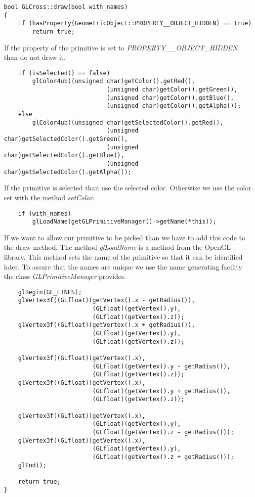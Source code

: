 \begin{verbatim}
bool GLCross::draw(bool with_names)
{
	if (hasProperty(GeometricObject::PROPERTY__OBJECT_HIDDEN) == true)
		return true;
\end{verbatim}

If the property of the primitive is set to {\em PROPERTY\_\_OBJECT\_HIDDEN} than
do not draw it. 

\begin{verbatim}
	if (isSelected() == false)
		glColor4ub((unsigned char)getColor().getRed(),
							 (unsigned char)getColor().getGreen(),
							 (unsigned char)getColor().getBlue(),
							 (unsigned char)getColor().getAlpha());
	else
		glColor4ub((unsigned char)getSelectedColor().getRed(),
							 (unsigned char)getSelectedColor().getGreen(),
							 (unsigned char)getSelectedColor().getBlue(),
							 (unsigned char)getSelectedColor().getAlpha());
\end{verbatim}

If the primitive is selected than use the selected color. Otherwise
we use the color set with the method {\em setColor}.

\begin{verbatim}
	if (with_names)
		glLoadName(getGLPrimitiveManager()->getName(*this));
\end{verbatim}

If we want to allow our primitive to be picked than we have to add this code
to the draw method. The method {\em glLoadName} is a method from the OpenGL
library. This method sets the name of the primitive so that it can be identified
later. To assure that the names are unique we use the name generating facility the class
{\em GLPrimitiveManager} provides.

\begin{verbatim}
	glBegin(GL_LINES);
	glVertex3f((GLfloat)(getVertex().x - getRadius()),
						 (GLfloat)(getVertex().y),
						 (GLfloat)(getVertex().z));
	glVertex3f((GLfloat)(getVertex().x + getRadius()),
						 (GLfloat)(getVertex().y),
						 (GLfloat)(getVertex().z));

	glVertex3f((GLfloat)(getVertex().x),
						 (GLfloat)(getVertex().y - getRadius()),
						 (GLfloat)(getVertex().z));
	glVertex3f((GLfloat)(getVertex().x),
						 (GLfloat)(getVertex().y + getRadius()),
						 (GLfloat)(getVertex().z));

	glVertex3f((GLfloat)(getVertex().x),
						 (GLfloat)(getVertex().y),
						 (GLfloat)(getVertex().z - getRadius()));
	glVertex3f((GLfloat)(getVertex().x),
						 (GLfloat)(getVertex().y),
						 (GLfloat)(getVertex().z + getRadius()));
	glEnd();

	return true;
}
\end{verbatim}

